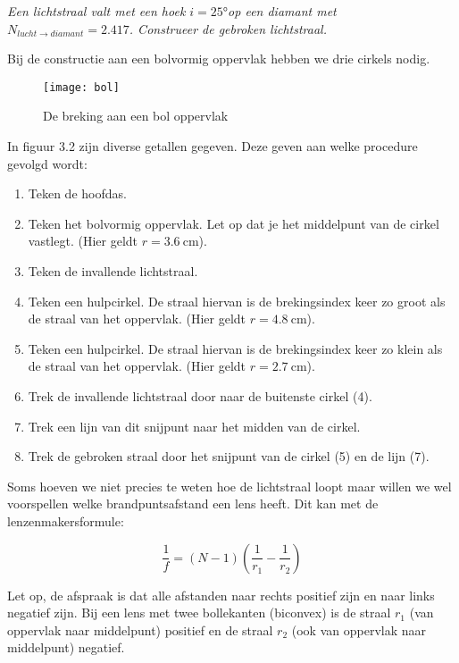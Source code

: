\emph{Een lichtstraal valt met een hoek $i=\ang{25}$op een diamant
met $N_{lucht\rightarrow diamant}=2.417$. Construeer de gebroken
lichtstraal.}

Bij de constructie aan een bolvormig oppervlak hebben we drie cirkels
nodig.

\begin{figure}[H]
\noindent \begin{centering}
\texttt{[image: bol]}
\par\end{centering}

\caption{De breking aan een bol oppervlak}
\end{figure}


In figuur 3.2 zijn diverse getallen gegeven. Deze geven aan welke
procedure gevolgd wordt:
\begin{enumerate}
\item Teken de hoofdas.
\item Teken het bolvormig oppervlak. Let op dat je het middelpunt van de
cirkel vastlegt. (Hier geldt $r=\SI{3.6}{\centi\meter}$).
\item Teken de invallende lichtstraal.
\item Teken een hulpcirkel. De straal hiervan is de brekingsindex keer zo
groot als de straal van het oppervlak. (Hier geldt $r=\SI{4.8}{\centi\meter}$).
\item Teken een hulpcirkel. De straal hiervan is de brekingsindex keer zo
klein als de straal van het oppervlak. (Hier geldt $r=\SI{2.7}{\centi\meter}$).
\item Trek de invallende lichtstraal door naar de buitenste cirkel (4).
\item Trek een lijn van dit snijpunt naar het midden van de cirkel.
\item Trek de gebroken straal door het snijpunt van de cirkel (5) en de
lijn (7).
\end{enumerate}
Soms hoeven we niet precies te weten hoe de lichtstraal loopt maar
willen we wel voorspellen welke brandpuntsafstand een lens heeft.
Dit kan met de lenzenmakersformule:

\[
\frac{1}{f}=(N-1)(\frac{1}{r_{1}}-\frac{1}{r_{2}})
\]


Let op, de afspraak is dat alle afstanden naar rechts positief zijn
en naar links negatief zijn. Bij een lens met twee bollekanten (biconvex)
is de straal $r_{1}$ (van oppervlak naar middelpunt) positief en
de straal $r_{2}$ (ook van oppervlak naar middelpunt) negatief.


